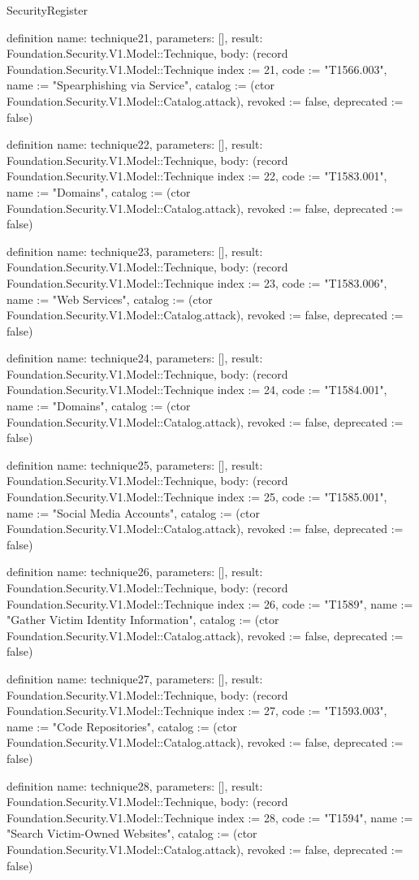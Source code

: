 \begin{lexlean}{SecurityRegister}
\begin{semanticmodule}
definition{
  name: technique21,
  parameters: [],
  result: Foundation.Security.V1.Model::Technique,
  body: (record Foundation.Security.V1.Model::Technique {index := 21, code := "T1566.003", name := "Spearphishing via Service", catalog := (ctor Foundation.Security.V1.Model::Catalog.attack), revoked := false, deprecated := false})
}

definition{
  name: technique22,
  parameters: [],
  result: Foundation.Security.V1.Model::Technique,
  body: (record Foundation.Security.V1.Model::Technique {index := 22, code := "T1583.001", name := "Domains", catalog := (ctor Foundation.Security.V1.Model::Catalog.attack), revoked := false, deprecated := false})
}

definition{
  name: technique23,
  parameters: [],
  result: Foundation.Security.V1.Model::Technique,
  body: (record Foundation.Security.V1.Model::Technique {index := 23, code := "T1583.006", name := "Web Services", catalog := (ctor Foundation.Security.V1.Model::Catalog.attack), revoked := false, deprecated := false})
}

definition{
  name: technique24,
  parameters: [],
  result: Foundation.Security.V1.Model::Technique,
  body: (record Foundation.Security.V1.Model::Technique {index := 24, code := "T1584.001", name := "Domains", catalog := (ctor Foundation.Security.V1.Model::Catalog.attack), revoked := false, deprecated := false})
}

definition{
  name: technique25,
  parameters: [],
  result: Foundation.Security.V1.Model::Technique,
  body: (record Foundation.Security.V1.Model::Technique {index := 25, code := "T1585.001", name := "Social Media Accounts", catalog := (ctor Foundation.Security.V1.Model::Catalog.attack), revoked := false, deprecated := false})
}

definition{
  name: technique26,
  parameters: [],
  result: Foundation.Security.V1.Model::Technique,
  body: (record Foundation.Security.V1.Model::Technique {index := 26, code := "T1589", name := "Gather Victim Identity Information", catalog := (ctor Foundation.Security.V1.Model::Catalog.attack), revoked := false, deprecated := false})
}

definition{
  name: technique27,
  parameters: [],
  result: Foundation.Security.V1.Model::Technique,
  body: (record Foundation.Security.V1.Model::Technique {index := 27, code := "T1593.003", name := "Code Repositories", catalog := (ctor Foundation.Security.V1.Model::Catalog.attack), revoked := false, deprecated := false})
}

definition{
  name: technique28,
  parameters: [],
  result: Foundation.Security.V1.Model::Technique,
  body: (record Foundation.Security.V1.Model::Technique {index := 28, code := "T1594", name := "Search Victim-Owned Websites", catalog := (ctor Foundation.Security.V1.Model::Catalog.attack), revoked := false, deprecated := false})
}


\end{semanticmodule}
\end{lexlean}
